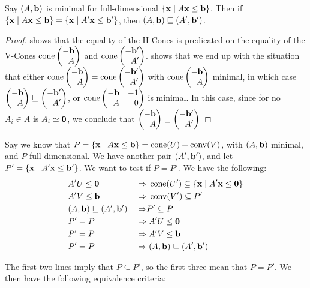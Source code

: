 \begin{Prop}
	Say $(A,\mathbf{b})$ is minimal for full-dimensional $\left\{\mathbf{x}\;|\; A\mathbf{x}\leq \mathbf{b}\right\}$.  Then if $\left\{\mathbf{x}\;|\; A\mathbf{x}\leq \mathbf{b}\right\} = \left\{\mathbf{x}\;|\; A'\mathbf{x}\leq \mathbf{b}'\right\}$, then $(A,\mathbf{b}) \sqsubseteq (A',\mathbf{b}')$.
\end{Prop}

\begin{proof}
   shows that the equality of the H-Cones is predicated on the equality of the V-Cones $\cone\pmb -\b \\ A \pme$ and $\cone\pmb -\b' \\ A' \pme$.   shows that we end up with the situation that either $\cone\pmb -\b \\ A \pme = \cone\pmb -\b' \\ A' \pme$ with $\cone\pmb -\b \\ A \pme$ minimal, in which case $\pmb -\b \\ A \pme \sqsubseteq \pmb -\b' \\ A' \pme$, or $\cone\pmb -\b & -1 \\ A & 0\pme$ is minimal.  In this case, since for no $A_i \in A$ is $A_i \simeq \mathbf{0}$, we conclude that $\pmb -\b \\ A \pme \sqsubseteq \pmb -\b' \\ A' \pme$
\end{proof}

Say we know that $P = \left\{\mathbf{x}\;|\; A\mathbf{x}\leq \mathbf{b}\right\} = \operatorname{cone}(U) + \operatorname{conv}(V)$, with $(A,\mathbf{b})$ minimal, and $P$ full-dimensional.  We have another pair $(A',\mathbf{b}')$, and let $P'=\left\{\mathbf{x}\;|\; A'\mathbf{x}\leq \mathbf{b}'\right\}$.  We want to test if $P = P'$.  We have the following:
\begin{alignat*}{2}
	 & A'U\leq\mathbf{0} \;                \; & \Rightarrow & \; \operatorname{cone}(U') \subseteq \left\{\mathbf{x}\;|\; A'\mathbf{x}\leq\mathbf{0}\right\} \\
	 & A'V\leq\mathbf{b} \;                   & \Rightarrow & \; \operatorname{conv}(V') \subseteq P'      \\
	 & (A,\mathbf{b}) \sqsubseteq (A',\mathbf{b}') \; & \Rightarrow & P' \subseteq P                 \\
	 & P' = P \;                      & \Rightarrow & \; A'U\leq\mathbf{0}                   \\
	 & P' = P \;                      & \Rightarrow & \; A'V\leq\mathbf{b}                   \\
	 & P' = P \;                      & \Rightarrow & \;(A,\mathbf{b}) \sqsubseteq (A',\mathbf{b}')
\end{alignat*}

The first two lines imply that $P \subseteq P'$, so the first three mean that $P = P'$.  We then have the following equivalence criteria:


